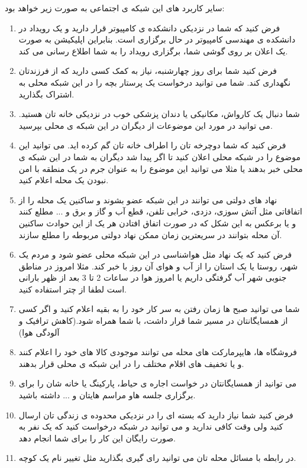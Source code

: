 سایر کاربرد های این شبکه ی اجتماعی به صورت زیر خواهد بود:

\begin{enumerate}
	\item 
	فرض کنید که شما در نزدیکی دانشکده ی کامپیوتر قرار دارید و یک رویداد در دانشکده ی مهندسی کامپیوتر در حال برگزاری است. بنابراین اپلیکیشن به صورت یک اعلان بر روی گوشی شما، برگزاری رویداد را به شما اطلاع رسانی می کند.
	\item 
	فرض کنید شما برای روز چهارشنبه، نیاز به کمک کسی دارید که از فرزندتان نگهداری کند. شما می توانید درخواست یک پرستار بچه را در این شبکه محلی به اشتراک بگذارید.
	
	\item 
	شما دنبال یک کارواش، مکانیکی یا دندان پزشکی خوب در نزدیکی خانه تان هستید. می توانید در مورد این موضوعات از دیگران در این شبکه ی محلی بپرسید.
	\item 
	فرض کنید که شما دوچرخه تان را اطراف خانه تان گم کرده اید. می توانید این موضوع را در شبکه محلی اعلان کنید تا اگر پیدا شد دیگران به شما در این شبکه ی محلی خبر بدهند یا مثلا می توانید این موضوع را به عنوان جرم در یک منطقه با امن نبودن یک محله اعلام کنید.
	
	\item 
	نهاد های دولتی می توانند در این شبکه عضو بشوند و ساکنین یک محله را از اتفاقاتی مثل آتش سوزی، دزدی، خرابی تلفن، قطع آب و گاز و برق و ... مطلع کنند و یا برعکس به این شکل که در صورت اتفاق افتادن هر یک از این حوادث ساکنین آن محله بتوانند در سریعترین زمان ممکن نهاد دولتی مربوطه را مطلع سازند.
	
	\item 
	فرض کنید که یک نهاد مثل هواشناسی در این شبکه محلی عضو شود و مردم یک شهر، روستا یا یک استان را از آب و هوای آن روز با خبر کند. مثلا امروز در مناطق جنوبی شهر آب گرفتگی داریم یا امروز هوا در ساعات  2 تا 3 بعد از ظهر بارانی است لطفا از چتر استفاده کنید.
	
	\item
	شما می توانید صبح ها زمان رفتن به سر کار خود را به بقیه اعلام کنید و اگر کسی از همسایگانتان در مسیر شما قرار داشت، با شما همراه شود.(کاهش ترافیک و آلودگی هوا)
	\item 
	فروشگاه ها، هایپرمارکت های محله می توانند موجودی کالا های خود را اعلام کنند و یا تخفیف های اقلام مختلف را در این شبکه ی محلی قرار بدهند.
	\item 
	می توانید از همسایگانتان در خواست اجاره ی حیاط، پارکینگ یا خانه شان را برای برگزاری جلسه هاو مراسم هایتان و ... داشته باشید.
	\item 
	فرض کنید شما نیاز دارید که بسته ای را در نزدیکی محدوده ی زندگی تان ارسال کنید ولی وقت کافی ندارید و می توانید در شبکه درخواست کنید که یک نفر به صورت رایگان این کار را برای شما انجام دهد.
	\item 
	در رابطه با مسائل محله تان می توانید رای گیری بگذارید مثل تغییر نام یک کوچه.
	 
\end{enumerate}
 
